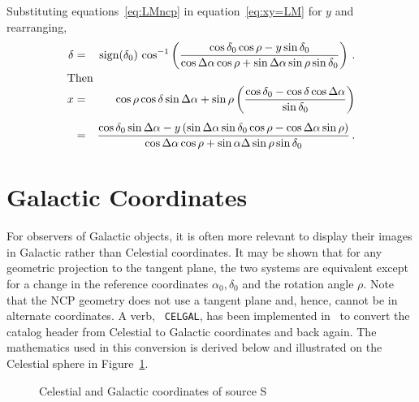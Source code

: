 Substituting equations~\ref{eq:LMncp} in equation~\ref{eq:xy=LM} for
$y$ and rearranging,
\begin{eqnarray*}
  \delta & = & \sign(\delta_0)\,\cos^{-1} \left( \frac{\cos\delta_0
           \cos\rho - y\sin\delta_0}{\cos\da\cos\rho +
           \sin\da\sin\rho\sin\delta_0} \right) \, . \\
\noalign{\hbox{Then}}
  x & = &\cos\rho\cos\delta\sin\da + \sin\rho\left(
         \frac{\cos\delta_0 - \cos\delta\cos\da}{\sin
         \delta_0} \right) \\
 \noalign{\vskip 4pt}
    & = &\frac{\cos\delta_0\sin\da - y\,(\sin\Delta
         \alpha\sin\delta_0\cos\rho-\cos\da\sin\rho)}{\cos
         \da\cos\rho + \sin\alpha\Delta\sin\rho\sin\delta_0}
         \, .
\end{eqnarray*}

\section{Galactic Coordinates}

For observers of Galactic objects, it is often more relevant to
display their images in Galactic rather than Celestial coordinates.
It may be shown that for any geometric projection to the tangent
plane, the two systems are equivalent except for a change in the
reference coordinates $\alpha_0,\delta_0$ and the rotation angle
$\rho$.  Note that the NCP geometry does not use a tangent plane
and, hence, cannot be in alternate coordinates.  A verb, {\tt
CELGAL}, has been implemented in \AIPS\ to convert the catalog
header from Celestial to Galactic coordinates and back again.  The
mathematics used in this conversion is derived below and illustrated
on the Celestial sphere in Figure~\ref{fig:galactic}.


\begin{figure}
\centerline{}
\caption{Celestial and Galactic coordinates of source
S}\label{fig:galactic}
\end{figure}

